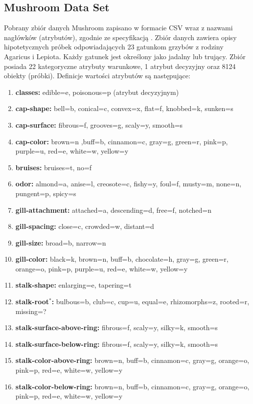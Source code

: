 \documentclass[10pt,a4paper]{article}
\begin{document}
\subsection{Mushroom Data Set}
Pobrany zbiór danych Mushroom zapisano w formacie CSV wraz z nazwami nagłówków (atrybutów), zgodnie ze specyfikacją \cite{MushroomDS}. Zbiór danych zawiera opisy hipotetycznych próbek odpowiadających 23 gatunkom grzybów z rodziny Agaricus i Lepiota. Każdy gatunek jest określony jako jadalny lub trujący. Zbiór posiada 22 kategoryczne atrybuty warunkowe, 1 atrybut decyzyjny oraz 8124 obiekty (próbki). Definicje wartości atrybutów są następujące:
\begin{enumerate}
	\item \textbf{classes:} edible=e, poisonous=p (atrybut decyzyjnym)
	\item \textbf{cap-shape:} bell=b, conical=c, convex=x, flat=f, knobbed=k, sunken=s
	\item \textbf{cap-surface:} fibrous=f, grooves=g, scaly=y, smooth=s
	\item \textbf{cap-color:} brown=n ,buff=b, cinnamon=c, gray=g, green=r, pink=p, purple=u, red=e, white=w, yellow=y
	\item \textbf{bruises:} bruises=t, no=f
	\item \textbf{odor:} almond=a, anise=l, creosote=c, fishy=y, foul=f, musty=m, none=n, pungent=p, spicy=s
	\item \textbf{gill-attachment:} attached=a, descending=d, free=f, notched=n
	\item \textbf{gill-spacing:} close=c, crowded=w, distant=d
	\item \textbf{gill-size:} broad=b, narrow=n
	\item \textbf{gill-color:} black=k, brown=n, buff=b, chocolate=h, gray=g, green=r, orange=o, pink=p, purple=u, red=e, white=w, yellow=y
	\item \textbf{stalk-shape:} enlarging=e, tapering=t
	\item \textbf{stalk-root$^*$:} bulbous=b, club=c, cup=u, equal=e, rhizomorphs=z, rooted=r, missing=?
	\item \textbf{stalk-surface-above-ring:} fibrous=f, scaly=y, silky=k, smooth=s
	\item \textbf{stalk-surface-below-ring:} fibrous=f, scaly=y, silky=k, smooth=s
	\item \textbf{stalk-color-above-ring:} brown=n, buff=b, cinnamon=c, gray=g, orange=o, pink=p, red=e, white=w, yellow=y
	\item \textbf{stalk-color-below-ring:} brown=n, buff=b, cinnamon=c, gray=g, orange=o, pink=p, red=e, white=w, yellow=y

\end{enumerate}
\end{document}
